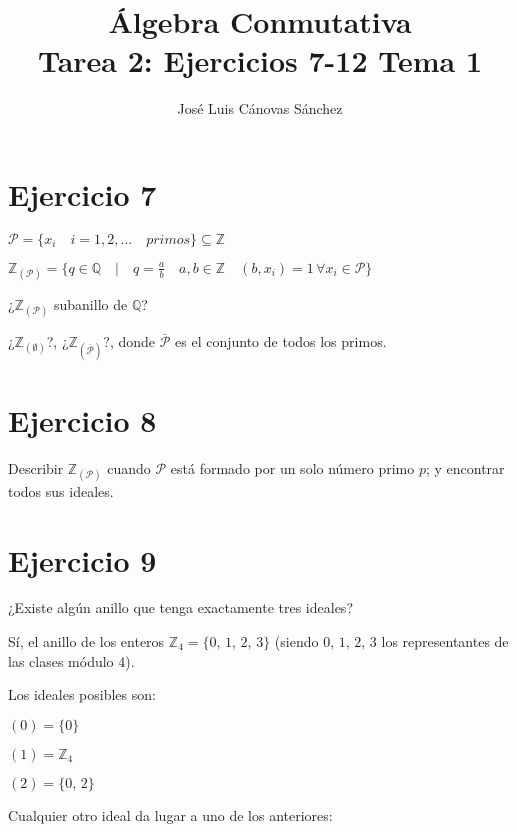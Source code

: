 \documentclass[10pt,a4paper]{article}
\author{José Luis Cánovas Sánchez}
\title{Álgebra Conmutativa\\Tarea 2: Ejercicios 7-12 Tema 1}
\begin{document}
	\maketitle
	
	\section*{Ejercicio 7}
	
	$\mathcal{P} = \{ x_i  \quad i=1,2,... \quad primos \}  \subseteq \mathbb{Z} $
	
	$\mathbb{Z}_{\left( \mathcal{P} \right)}  = \{ q \in \mathbb{Q} \quad \vert \quad q = \frac{a}{b} \quad a, b \in \mathbb{Z}   \quad (b,x_i) = 1  \, \forall x_i \in \mathcal{P}  \}$
	
	¿$ \mathbb{Z}_{\left( \mathcal{P} \right)} $ subanillo de $\mathbb{Q}$? 
	
	¿$\mathbb{Z}_{\left( \emptyset \right)} $?,  ¿$\mathbb{Z}_{\left( \overline{\mathcal{P}} \right)} $?, donde $\overline{\mathcal{P}}$ es el conjunto de todos los primos.
	
	
	\hfill
	
	
	
	
	\section*{Ejercicio 8}
	
	Describir $\mathbb{Z}_{\left( \mathcal{P} \right)} $ cuando $\mathcal{P}$ está formado por un solo número primo $p$; y encontrar todos sus ideales.
	
	\hfill
	
	
	\section*{Ejercicio 9}
	
	¿Existe algún anillo que tenga exactamente tres ideales?
	
	
	\hfill
	
	
	Sí, el anillo de los enteros $\mathbb{Z}_4 = \{0,\, 1,\, 2,\, 3\}$ (siendo $0,\, 1,\, 2,\, 3$ los representantes de las clases módulo 4).
	
	Los ideales posibles son:
	
	$(0) = \{0\} $
	
	$(1) = \mathbb{Z}_4 $
	
	$(2) = \{ 0,\, 2  \} $
	
	\hfil
	
	Cualquier otro ideal da lugar a uno de los anteriores:
	
\end{document}
